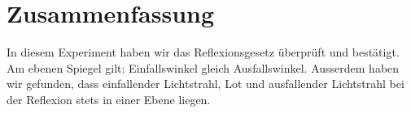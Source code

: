 \documentclass[11pt,a4paper]{article}
\begin{document}
\section{Zusammenfassung}
In diesem Experiment haben wir das Reflexionsgesetz überprüft und bestätigt. 
Am ebenen Spiegel gilt: Einfallswinkel gleich Ausfallswinkel.
Ausserdem haben wir gefunden, dass einfallender Lichtstrahl, Lot und ausfallender Lichtstrahl bei der Reflexion stets in einer Ebene liegen.
\end{document}
